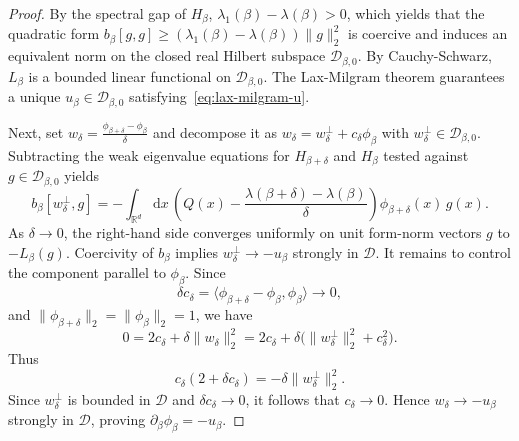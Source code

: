\documentclass[11pt,reqno]{amsart}
\theoremstyle{definition}
\numberwithin{equation}{section}
\newcommand{\<}{\langle}
\renewcommand{\>}{\rangle}
\def\de{{\rm d}}
\def\de{{\mathrm {d}}}
\begin{document}
\begin{appendix}
\begin{proof}
By the spectral gap of $H_\beta$, $\lambda_1(\beta) - \lambda(\beta) > 0$, which yields that the quadratic form $b_{\beta}[g,g] \ge (\lambda_1(\beta) - \lambda(\beta))\|g\|_2^2$ is coercive and induces an equivalent norm on the closed real Hilbert subspace $\mathcal{D}_{\beta,0}$. By Cauchy-Schwarz, $L_{\beta}$ is a bounded linear functional on $\mathcal{D}_{\beta,0}$. The Lax-Milgram theorem guarantees a unique $u_{\beta} \in \mathcal{D}_{\beta,0}$ satisfying~\eqref{eq:lax-milgram-u}.

Next, set $w_{\delta} = \frac{\phi_{\beta+\delta} - \phi_{\beta}}{\delta}$ and decompose it as $w_{\delta} = w_{\delta}^\perp + c_{\delta} \phi_{\beta}$ with $w_{\delta}^\perp \in \mathcal{D}_{\beta,0}$. Subtracting the weak eigenvalue equations for $H_{\beta+\delta}$ and $H_{\beta}$ tested against $g \in \mathcal{D}_{\beta,0}$ yields
\[
b_{\beta}[w_{\delta}^\perp, g] = -\int_{\mathbb{R}^d} \de x \, \left(Q(x) - \frac{\lambda(\beta+\delta) - \lambda(\beta)}{\delta}\right) \phi_{\beta+\delta} (x) \, g(x).
\]
As $\delta \to 0$, the right-hand side converges uniformly on unit form-norm vectors $g$ to $-L_{\beta}(g)$. Coercivity of $b_{\beta}$ implies $w_{\delta}^\perp \to -u_{\beta}$ strongly in $\mathcal{D}$. 
It remains to
control the component parallel to $\phi_\beta$. Since
\[
 \delta c_\delta
 =\langle\phi_{\beta+\delta}-\phi_\beta,\phi_\beta\rangle
 \longrightarrow 0,
\]
and $\|\phi_{\beta+\delta}\|_2=\|\phi_\beta\|_2=1$, we have
\[
 0
 =2c_\delta+\delta\|w_\delta\|_2^2
 =2c_\delta+\delta\bigl(\|w_\delta^\perp\|_2^2+c_\delta^2\bigr).
\]
Thus
\[
 c_\delta(2+\delta c_\delta)
 =-\delta\|w_\delta^\perp\|_2^2.
\]
Since $w_\delta^\perp$ is bounded in $\mathcal D$ and
$\delta c_\delta\to0$, it follows that $c_\delta\to0$. Hence
$w_\delta\to-u_\beta$ strongly in $\mathcal D$, proving
$\partial_\beta\phi_\beta=-u_\beta$.


\end{proof}
\end{appendix}
\end{document}

